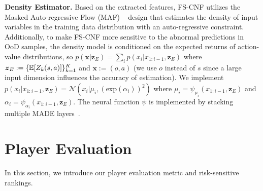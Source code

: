 \documentclass{article}
\newcommand{\modelParamter}{\omega}
\newcommand{\datapoint}{x}
\newcommand{\condition}{\boldsymbol{z}_{E}}
\newcommand{\state}{s}
\newcommand{\observation}{o}
\newcommand{\action}{a}
\newcommand{\agentIndex}{k}
\newcommand{\dataset}{\mathcal{D}}
\newcommand{\expect}{\mathbb{E}}
\newcommand{\feature}{e}
\newcommand{\splitnum}{m}
\begin{document}
\noindent\textbf{Density Estimator.} Based on the extracted features, FS-CNF utilizes the Masked Auto-regressive Flow (MAF)
~\cite{Papamakarios2017MAF} design that estimates the density of input variables in the training data distribution with an auto-regressive constraint. Additionally, to make FS-CNF more sensitive to the abnormal predictions in OoD samples, the density model is conditioned on the expected returns of action-value distributions, so $p(\boldsymbol{\datapoint}|{\condition})=\sum_{i}p(\datapoint_{i}|\datapoint_{1:i-1},{\condition})$  where ${\condition}:=\{\expect[Z_{\agentIndex}(\state,\action)]\}_{\agentIndex=1}^{\MakeUppercase{\agentIndex}}$ and $\boldsymbol{\datapoint}:=(\observation,\action)$ (we use $\observation$ instead of $\state$ since a large input dimension influences the accuracy of estimation). We implement $p(\datapoint_{i}|\datapoint_{1:i-1},\condition)=\mathcal{N}(\datapoint_{i}|\mu_{i},(\text{exp}(\alpha_{i}))^{2})$ where $\mu_{i}=\psi_{\mu_{i}}(\datapoint_{1:i-1},\condition)$ and $\alpha_{i} = \psi_{\alpha_{i}}(\datapoint_{1:i-1},\condition)$. The neural function $\psi$ is implemented by stacking multiple MADE layers~\cite{Dias2020NFAnomaly}.

\section{Player Evaluation}\label{Sec:player-evaluation}
In this section, we introduce our player evaluation metric and risk-sensitive rankings.
\end{document}
